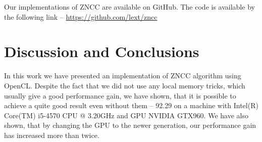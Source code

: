 \documentclass[conference]{IEEEtran}
\begin{document}
Our implementations of ZNCC are available on GitHub. The code is available by the following link -- \url{https://github.com/lext/zncc}

\section{Discussion and Conclusions}
In this work we have presented an implementation of ZNCC algorithm using OpenCL. Despite the fact that we did not use any local memory tricks, which usually give a good performance gain, we have shown, that it is possible to  achieve a quite good result even without them -- 92.29 on a machine with Intel(R) Core(TM) i5-4570 CPU @ 3.20GHz and GPU NVIDIA GTX960. We have also shown, that by changing the GPU to the newer generation, our performance gain has increased more than twice.



\end{document}
